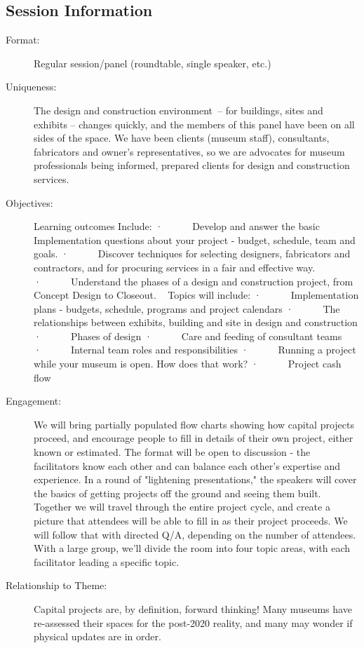 \documentclass{report}
\begin{document}
              \subsection*{Session Information}
                \begin{description}
                  \item [Format:] Regular session/panel (roundtable, single speaker, etc.)
							    
							    \item [Uniqueness:]The design and construction environment – for buildings, sites and exhibits – changes quickly, and the members of this panel have been on all sides of the space. We have been clients (museum staff), consultants, fabricators and owner’s representatives, so we are advocates for museum professionals being informed, prepared clients for design and construction services.
							    \item [Objectives:]Learning outcomes Include:
·      Develop and answer the basic Implementation questions about your project - budget, schedule, team and goals.
·      Discover techniques for selecting designers, fabricators and contractors, and for procuring services in a fair and effective way.
·      Understand the phases of a design and construction project, from Concept Design to Closeout.
 
Topics will include:
·      Implementation plans - budgets, schedule, programs and project calendars 
·      The relationships between exhibits, building and site in design and construction 
·      Phases of design
·      Care and feeding of consultant teams
·      Internal team roles and responsibilities 
·      Running a project while your museum is open. How does that work? 
·      Project cash flow
							    \item [Engagement:]We will bring partially populated flow charts showing how capital projects proceed, and encourage people to fill in details of their own project, either known or estimated. The format will be open to discussion - the facilitators know each other and can balance each other's expertise and experience. 
    In a round of "lightening presentations," the speakers will cover the basics of getting projects off the ground and seeing them built. Together we will travel through the entire project cycle, and create a picture that attendees will be able to fill in as their project proceeds. We will follow that with directed Q/A, depending on the number of attendees. With a large group, we'll divide the room into four topic areas, with each facilitator leading a specific topic.
							    \item [Relationship to Theme:]Capital projects are, by definition, forward thinking! Many museums have re-assessed their spaces for the post-2020 reality, and many may wonder if physical updates are in order.
							    

\end{description}
\end{document}
